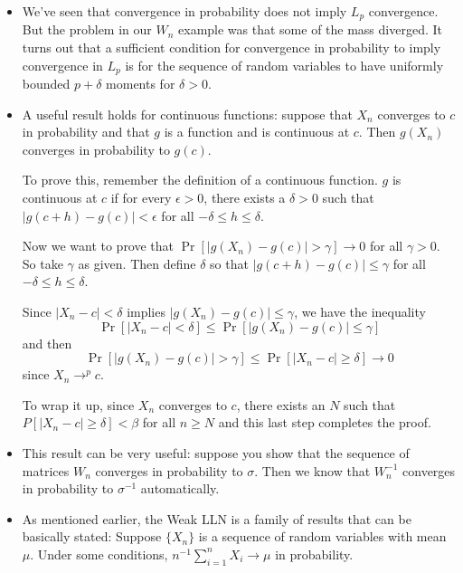 \begin{itemize}
\item We've seen that convergence in probability does not imply $L_p$
  convergence.  But the problem in our $W_n$ example was that some of
  the mass diverged.  It turns out that a sufficient condition for
  convergence in probability to imply convergence in $L_p$ is for the
  sequence of random variables to have uniformly bounded $p + \delta$
  moments for $\delta > 0$.

\item A useful result holds for continuous functions: suppose that
  $X_n$ converges to $c$ in probability and that $g$ is a function and
  is continuous at $c$.  Then $g(X_n)$ converges in probability to
  $g(c)$.

  To prove this, remember the definition of a continuous function.
  $g$ is continuous at $c$ if for every $\epsilon >0$, there exists a $\delta > 0$
  such that $|g(c + h) - g(c)| < \epsilon$ for all $-\delta \leq h \leq \delta$.

  Now we want to prove that $\Pr[|g(X_n) - g(c)| > \gamma] \to 0$ for all $\gamma
  > 0$.  So take $\gamma$ as given.  Then define $\delta$ so that $|g(c + h) -
  g(c)| \leq \gamma$ for all $-\delta \leq h \leq \delta$.

  Since $|X_n - c| < \delta$ implies $|g(X_n) - g(c)| \leq \gamma$, we have the
  inequality
  \begin{equation*}
    \Pr[ |X_n - c| < \delta] \leq \Pr[ |g(X_n) - g(c)| \leq \gamma ]
  \end{equation*}
  and then
  \begin{equation*}
    \Pr[|g(X_n) - g(c)| > \gamma] \leq \Pr[|X_n - c| \geq \delta] \to 0
  \end{equation*}
  since $X_n \to^p c$.

  To wrap it up, since $X_n$ converges to $c$, there exists an $N$
  such that $P[|X_n - c| \geq \delta] < \beta$ for all $n \geq N$ and this last step
  completes the proof.

\item This result can be very useful: suppose you show that the
  sequence of matrices $W_n$ converges in probability to $\sigma$.  Then we
  know that $W_n^{-1}$ converges in probability to $\sigma^{-1}$ automatically.


\item As mentioned earlier, the Weak LLN is a family of results that
  can be basically stated: Suppose $\{X_n\}$ is a sequence of random
  variables with mean $\mu$.  Under some conditions, $n^{-1} \sum_{i=1}^n
  X_i \to \mu$ in probability.


\end{itemize}
